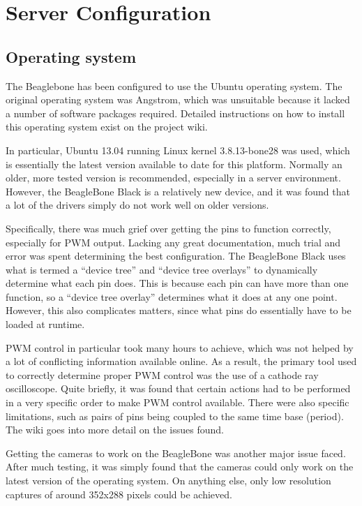 \section{Server Configuration}

\subsection{Operating system}
The Beaglebone has been configured to use the Ubuntu operating system. The original operating system was Angstrom, which was unsuitable because it lacked a number of software packages required. Detailed instructions on how to install this operating system exist on the project wiki\cite{mctx3420_wiki}.

In particular, Ubuntu 13.04 running Linux kernel 3.8.13-bone28 was used, which is essentially the latest version available to date for this platform. Normally an older, more tested version is recommended, especially in a server environment. However, the BeagleBone Black is a relatively new device, and it was found that a lot of the drivers simply do not work well on older versions.

Specifically, there was much grief over getting the pins to function correctly, especially for PWM output. Lacking any great documentation, much trial and error was spent determining the best configuration. The BeagleBone Black uses what is termed a ``device tree'' \cite{beaglebone3.8, devicetreetutorial} and ``device tree overlays'' to dynamically determine what each pin does. This is because each pin can have more than one function, so a ``device tree overlay'' determines what it does at any one point. However, this also complicates matters, since what pins do essentially have to be loaded at runtime. 

PWM control in particular took many hours to achieve, which was not helped by a lot of conflicting information available online. As a result, the primary tool used to correctly determine proper PWM control was the use of a cathode ray oscilloscope. Quite briefly, it was found that certain actions had to be performed in a very specific order to make PWM control available. There were also specific limitations, such as pairs of pins being coupled to the same time base (period). The wiki goes into more detail on the issues found.

Getting the cameras to work on the BeagleBone was another major issue faced. After much testing, it was simply found that the cameras could only work on the latest version of the operating system. On anything else, only low resolution captures of around 352x288 pixels could be achieved.

